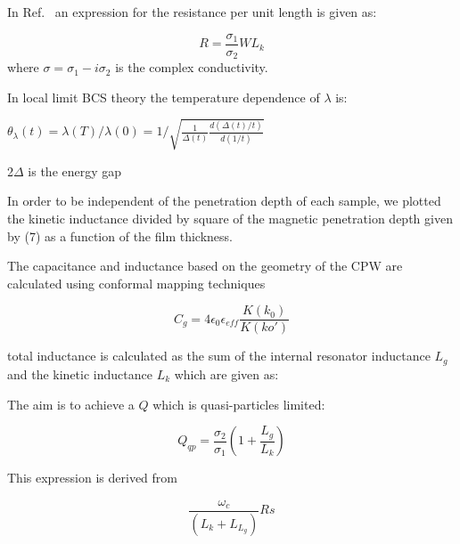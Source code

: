 In Ref.~\citep{402973} an expression for the resistance per unit length is given as:

\begin{equation}
\label{eq:reistanceperunitlength}
R = \frac{\sigma_{1}}{\sigma_{2}} W L_{k}
\end{equation} 
where $\sigma= \sigma_{1}-i\sigma_{2}$ is the complex conductivity. 

  
In local limit BCS theory the temperature dependence of $\lambda$ is:

$\theta_{\lambda} (t) = \lambda (T)/ \lambda (0) = 1 / \sqrt{\frac{1}{\Delta (t)} \frac{d(\Delta (t)/t)}{d(1/t)}}$

2$\Delta$ is the energy gap 


In order to be independent of the penetration
depth of each sample, we plotted the kinetic inductance
divided by square of the magnetic penetration depth given by
(7) as a function of the film thickness.

The capacitance and inductance based on the geometry of the CPW are calculated using conformal mapping techniques 


\begin{equation}
\label{eq:geometriccapacitance}
C_{g}=4\epsilon_{0}\epsilon_{eff}\frac{K(k_{0})}{K(ko')}
\end{equation}








total inductance is calculated as the sum of the internal resonator inductance $L_{g}$ and the kinetic inductance $L_{k}$ which are given as: 




The aim is to achieve a $Q$ which is quasi-particles limited:

\begin{equation}
\label{eq:Qquasilimited}
Q_{qp} = \frac{\sigma_{2}}{\sigma_{1}} \left ( 1 + \frac{L_{g}}{L_{k}} \right )
\end{equation} 



\noindent This expression is derived from 

\begin{equation}
\label{eq:quasilimited1}
\frac{\omega_{c}}{(L_{k}+L_{L_{g}})}{Rs}
\end{equation}


